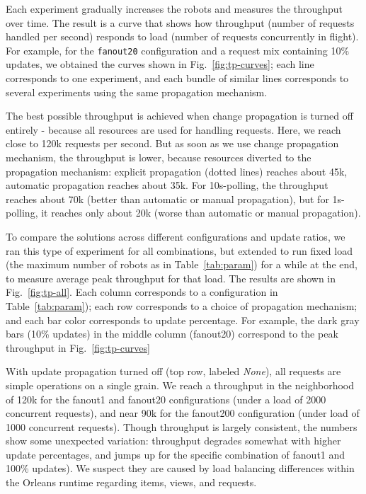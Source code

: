 Each experiment gradually increases the robots and measures the throughput over time. The result is a curve that shows how throughput (number of requests handled per second) responds to load (number of requests concurrently in flight). For example, for the \lstinline|fanout20| configuration and a request mix containing 10\% updates, we obtained the curves shown in Fig.~\ref{fig:tp-curves}; each line corresponds to one experiment, and each bundle of similar lines corresponds to several experiments using the same propagation mechanism. 

The best possible throughput is achieved when change propagation is turned off entirely - because all resources are used for handling requests. Here, we reach close to 120k requests per second. But as soon as we use change propagation mechanism, the throughput is lower, because resources diverted to the propagation mechanism: explicit propagation (dotted lines) reaches about 45k, automatic  propagation reaches about 35k. For 10s-polling, the throughput reaches about 70k (better than automatic or manual propagation), but for 1s-polling, it reaches only about 20k (worse than automatic or manual propagation). 

To compare the solutions across different configurations and update ratios, we ran this type of experiment for all combinations, but extended to run fixed load (the maximum number of robots as in Table~\ref{tab:param}) for a while at the end, to measure average  peak throughput for that load. The results are shown in Fig.~\ref{fig:tp-all}. Each column corresponds to a configuration in Table~\ref{tab:param}); each row corresponds to a choice of propagation mechanism; and each bar color corresponds to update percentage. For example, the dark gray bars (10\% updates) in the middle column (fanout20) correspond to the peak throughput in Fig.~\ref{fig:tp-curves}

 With update propagation turned off (top row, labeled \emph{None}), all requests are simple operations on a single grain. We reach a throughput in the neighborhood of  120k for the fanout1 and fanout20 configurations (under a load of 2000 concurrent requests), and near 90k for the fanout200 configuration (under load of 1000 concurrent requests). Though throughput is largely consistent, the numbers show some unexpected variation: throughput degrades somewhat with higher update percentages, and jumps up for the specific combination of fanout1 and 100\% updates). We suspect they are caused by load balancing differences within the Orleans runtime regarding items, views, and requests.

